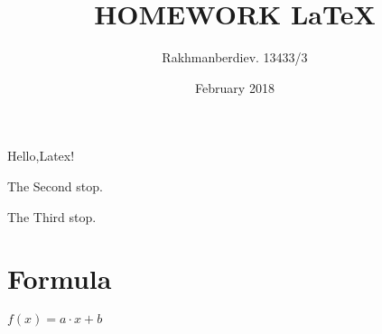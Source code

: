 \documentclass[a4paper,12pt]{article}
\title{HOMEWORK \LaTeX}
\author{Rakhmanberdiev. 13433/3}
\date{February 2018}
\begin{document}
\maketitle
Hello,Latex!

The Second stop.

The Third stop.
\section{Formula}
$f(x) = a\cdot x + b$
\end{document}
